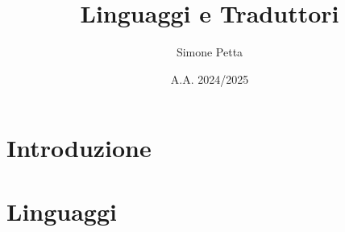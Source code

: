 \documentclass[a4paper,12pt]{report}
\title{Linguaggi e Traduttori}
\author{Simone Petta}
\date{A.A. 2024/2025}
\begin{document}
\maketitle

\chapter{Introduzione}


\chapter{Linguaggi}

\end{document}
